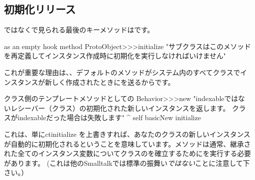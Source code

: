 \documentclass[a4paper,10pt,twoside]{book}
\begin{document}

\subsection{初期化リリース}

ではなくで見られる最後のキーメソッドはです。

\begin{method}{ as an empty hook method}
ProtoObject>>>initialize
   "サブクラスはこのメソッドを再定義してインスタンス作成時に初期化を実行しなければいけません"
\end{method}

これが重要な理由は、、デフォルトのメソッドがシステム内のすべてクラスでインスタンスが新しく作成されたときにを送るからです。

\begin{method}{クラス側のテンプレートメソッドとしての}
Behavior>>>new
    "indexableではないレシーバー（クラス）の初期化された新しいインスタンスを返します。
    クラスがindexableだった場合は失敗します"
    ^ self basicNew initialize
\end{method}

これは、単にct{initialize} を上書きすれば、あなたのクラスの新しいインスタンスが自動的に初期化されるということを意味しています。メソッドは通常、継承された全てのインスタンス変数についてクラスのを確立するためにを実行する必要があります。
(これは他のSmalltalkでは標準の振舞い\emph{ではない}ことに注意して下さい。）
\end{document}
